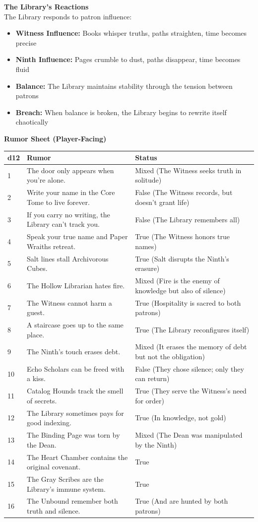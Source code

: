 \documentclass[10pt,letterpaper]{article}
\newcommand{\sectionheader}[1]{\vspace{0.5em}\textbf{\large #1}\\[0.3em]}
\begin{document}
\sectionheader{The Library's Reactions}

The Library responds to patron influence:
\begin{itemize}
    \item \textbf{Witness Influence:} Books whisper truths, paths straighten, time becomes precise
    \item \textbf{Ninth Influence:} Pages crumble to dust, paths disappear, time becomes fluid
    \item \textbf{Balance:} The Library maintains stability through the tension between patrons
    \item \textbf{Breach:} When balance is broken, the Library begins to rewrite itself chaotically
\end{itemize}

\sectionheader{Rumor Sheet (Player-Facing)}
\begin{longtable}{@{}p{0.6cm}p{11cm}p{2.2cm}@{}}
\toprule
\textbf{d12} & \textbf{Rumor} & \textbf{Status}\\
\midrule
1 & The door only appears when you're alone. & Mixed (The Witness seeks truth in solitude) \\
2 & Write your name in the Core Tome to live forever. & False (The Witness records, but doesn't grant life) \\
3 & If you carry no writing, the Library can't track you. & False (The Library remembers all) \\
4 & Speak your true name and Paper Wraiths retreat. & True (The Witness honors true names) \\
5 & Salt lines stall Archivorous Cubes. & True (Salt disrupts the Ninth's erasure) \\
6 & The Hollow Librarian hates fire. & Mixed (Fire is the enemy of knowledge but also of silence) \\
7 & The Witness cannot harm a guest. & True (Hospitality is sacred to both patrons) \\
8 & A staircase goes up to the same place. & True (The Library reconfigures itself) \\
9 & The Ninth's touch erases debt. & Mixed (It erases the memory of debt but not the obligation) \\
10 & Echo Scholars can be freed with a kiss. & False (They chose silence; only they can return) \\
11 & Catalog Hounds track the smell of secrets. & True (They serve the Witness's need for order) \\
12 & The Library sometimes pays for good indexing. & True (In knowledge, not gold) \\
13 & The Binding Page was torn by the Dean. & Mixed (The Dean was manipulated by the Ninth) \\
14 & The Heart Chamber contains the original covenant. & True \\
15 & The Gray Scribes are the Library's immune system. & True \\
16 & The Unbound remember both truth and silence. & True (And are hunted by both patrons) \\
\bottomrule
\end{longtable}
\end{document}
